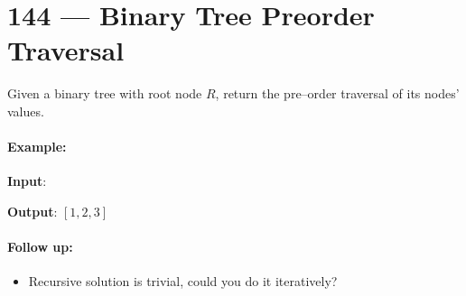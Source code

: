 \section{144 --- Binary Tree Preorder Traversal}
Given a binary tree with root node $R$, return the pre--order traversal of its nodes' values.
\paragraph{Example:}
\begin{flushleft}
\textbf{Input}:
\begin{figure}[H]
\end{figure}
\textbf{Output}: $[1,2,3]$
\end{flushleft}
\paragraph{Follow up:}
\begin{itemize}
\item Recursive solution is trivial, could you do it iteratively?
\end{itemize}
